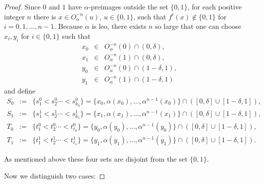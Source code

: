 \documentclass[12pt, a4paper]{amsart}
\newcommand{\?}{{\bf ???}}
\begin{document}
\begin{proof}
Since $0$ and $1$ have  $\alpha$-preimages outside the set $\{0,1\}$, for each positive integer $n$ there is $x\in O_{\alpha}^{-n}(u)$, $u\in\{0,1\}$, such that $f^i(x)\notin \{0,1\}$ for $i=0,1,\ldots,n-1$.
Because $\alpha$ is leo, there exists $n$ so large that one can  choose $x_i,y_i$  for $i\in \{0,1\}$ such that
\begin{eqnarray*}
    x_0 &\in & O_{\alpha}^{-n}(0)\cap (0,\delta),\\
    x_1 &\in & O_{\alpha}^{-n}(1)\cap (0,\delta),\\
    y_0 &\in & O_{\alpha}^{-n}(0)\cap (1-\delta,1),\\
    y_1 &\in & O_{\alpha}^{-n}(1)\cap (1-\delta,1)
    \end{eqnarray*}
and define  
\begin{eqnarray*}
    S_0 &:=& \{s^0_1<s^0_2\cdots<s^0_{k_0}\}=\{x_0,\alpha(x_0),\dots,\alpha^{n-1}(x_0)\}\cap ([0,\delta]\cup [1-\delta,1]),\\
    S_1 &:= & \{s^1_1<s^1_2\cdots<s^1_{k_1}\}=\{x_1,\alpha(x_1),\dots,\alpha^{n-1}(x_1)\}\cap ([0,\delta]\cup [1-\delta,1]),\\
    T_0 &:= &\{t^0_1<t^0_2\cdots<t^0_{\ell_{0}}\}=\{y_0,\alpha(y_0),\dots,\alpha^{n-1}(y_0)\}\cap ([0,\delta]\cup [1-\delta,1]),\\
  T_1 & := & \{t^1_1<t^1_2\cdots<t^1_{\ell_{1}}\}=\{y_1,\alpha(y_1),\dots,\alpha^{n-1}(y_1)\}\cap ([0,\delta]\cup [1-\delta,1]).
    \end{eqnarray*}

As mentioned above these four sets are disjoint from the set $\{0,1\}$.

 Now we distinguish two cases:
    

\end{proof}
\end{document}
